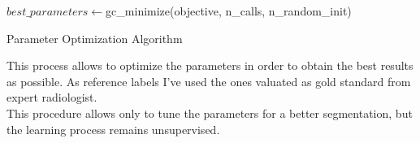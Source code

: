 \documentclass{standalone}
\begin{document}
	
	\begin{algorithm}[h!]
	
		\SetAlgoLined
		\DontPrintSemicolon
		
		
			
		
		
		$best\_parameters\leftarrow$gc\_minimize(objective, n\_calls, n\_random\_init)\;
		
			\caption{Parameter Optimization Algorithm}\label{alg:optimize}
	\end{algorithm}
		
		
	This process allows to optimize the parameters in order to obtain the best results as possible. As reference labels I've used the ones valuated as gold standard from expert radiologist.\\ This procedure allows only to tune the parameters for a better segmentation, but the learning process remains unsupervised.
\end{document}
